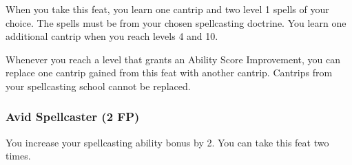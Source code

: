     When you take this feat, you learn one cantrip and two level 1 spells of your choice.
    The spells must be from your chosen spellcasting doctrine.
    You learn one additional cantrip when you reach levels 4 and 10.

    Whenever you reach a level that grants an Ability Score Improvement, you can replace one cantrip gained from this feat with another cantrip.
    Cantrips from your spellcasting school cannot be replaced.

\subsubsection{Avid Spellcaster (2 FP)} \label{feat::avidspellcaster}
    You increase your spellcasting ability bonus by 2.
    You can take this feat two times.

